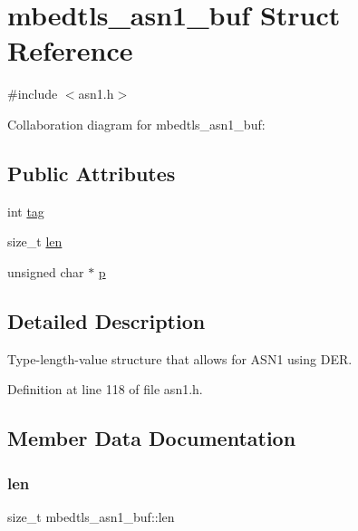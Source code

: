 \hypertarget{structmbedtls__asn1__buf}{}\section{mbedtls\+\_\+asn1\+\_\+buf Struct Reference}
\label{structmbedtls__asn1__buf}


{\ttfamily \#include $<$asn1.\+h$>$}



Collaboration diagram for mbedtls\+\_\+asn1\+\_\+buf\+:
\subsection*{Public Attributes}
\begin{DoxyCompactItemize}
\item 
int \mbox{\hyperlink{structmbedtls__asn1__buf_abcca2df9a773acd5b59831ac55993dd1}{tag}}
\item 
size\+\_\+t \mbox{\hyperlink{structmbedtls__asn1__buf_a046821787f2c5ecbf2df9f15e0d9486c}{len}}
\item 
unsigned char $\ast$ \mbox{\hyperlink{structmbedtls__asn1__buf_a0af0cf9b0801a21ce4652e859876f195}{p}}
\end{DoxyCompactItemize}


\subsection{Detailed Description}
Type-\/length-\/value structure that allows for A\+S\+N1 using D\+ER. 

Definition at line 118 of file asn1.\+h.



\subsection{Member Data Documentation}
\mbox{\label{structmbedtls__asn1__buf_a046821787f2c5ecbf2df9f15e0d9486c}} 
\subsubsection{\texorpdfstring{len}{len}}
{\footnotesize\ttfamily size\+\_\+t mbedtls\+\_\+asn1\+\_\+buf\+::len}

